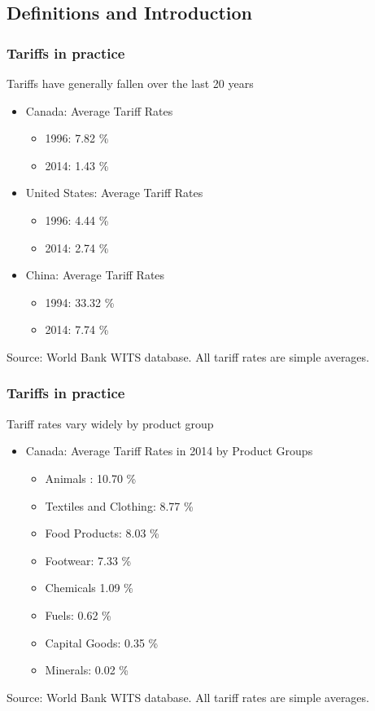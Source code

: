 \documentclass{beamer}
\begin{document}
\subsection{Definitions and Introduction}

\begin{frame}
\frametitle{Tariffs in practice}

Tariffs have generally fallen over the last 20 years
\begin{itemize}
  \item Canada: Average Tariff Rates 
	  \begin{itemize}
	  	\item 1996: 7.82 \%
	  	\item 2014: 1.43 \%
	  \end{itemize}
	   \item United States: Average Tariff Rates 
	    \begin{itemize}
	    	\item 1996: 4.44 \%
	    	\item 2014:  2.74 \%
	    \end{itemize}
	   \item China: Average Tariff Rates 
	   \begin{itemize}
	   	\item 1994: 33.32 \%
	   	\item 2014: 7.74 \%
	   \end{itemize}
\end{itemize}

\begin{center}
	Source: World Bank WITS database. All tariff rates are simple averages.
\end{center}

\end{frame}



\begin{frame}
	\frametitle{Tariffs in practice}
Tariff rates vary widely by product group
\begin{itemize}
  \item Canada: Average Tariff Rates in 2014 by Product Groups
  \begin{itemize}
	\item Animals : 10.70 \%
	\item Textiles and Clothing: 8.77 \%
	\item Food Products: 8.03 \%
	\item Footwear: 7.33 \%
	\item Chemicals 1.09 \%
	\item Fuels: 0.62 \%
	\item Capital Goods: 0.35 \%
	\item Minerals: 0.02 \%

  \end{itemize}
\end{itemize}
\begin{center}
	Source: World Bank WITS database. All tariff rates are simple averages.
\end{center}
	
\end{frame}
\end{document}
